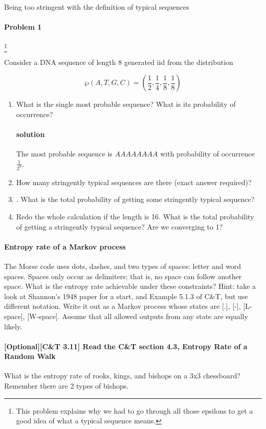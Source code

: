 \documentclass{article}
\begin{document}
 
Being too stringent with the definition of typical sequences 

\paragraph{Problem 1} \footnote{This problem explains why we had to go through all those
epsilons to get a good idea of what a typical sequence means.}

Consider a DNA sequence of length 8 generated iid from the distribution 
    
$$ \wp(A, T, G, C) = (\frac{1}{2}, \frac{1}{4}, \frac{1}{8}, \frac{1}{8})$$

\begin{enumerate}
    \item What is the single most probable sequence? What is its probability of
        occurrence?
        \paragraph{solution} The most probable sequence is $AAAAAAAA$ with
        probability of occurrence $\frac{1}{2^8}$.

    \item How many stringently typical sequences are there (exact answer
        required)?  

    \item. What is the total probability of getting some stringently typical
        sequence?

    \item Redo the whole calculation if the length is 16. What is the total
        probability of getting a stringently typical sequence? Are we converging
        to 1?  

\end{enumerate}

\paragraph{Entropy rate of a Markov process}

The Morse code uses dots, dashes, and two types of spaces: letter and word
spaces.  Spaces only occur as delimiters; that is, no space can follow another
space. What is the entropy rate achievable under these constraints?  Hint: take
a look at Shannon’s 1948 paper for a start, and Example 5.1.3 of C\&T, but use
different notation. Write it out as a Markov process whose states are [.], [-],
[L-space], [W-space]. Assume that all allowed outputs from any state are equally
likely.  

\paragraph{[Optional][C\&T 3.11] Read the C\&T section 4.3, Entropy Rate of a
    Random Walk}  What is the entropy rate of rooks, kings, and bishops on a 3x3
chessboard?  Remember there are 2 types of bishops.
\end{document}
